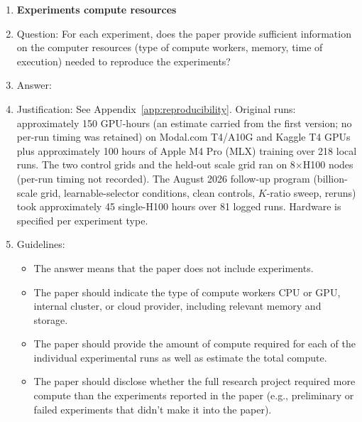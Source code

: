 \documentclass{article}
\begin{document}
\begin{enumerate}
\item {\bf Experiments compute resources}
    \item[] Question: For each experiment, does the paper provide sufficient information on the computer resources (type of compute workers, memory, time of execution) needed to reproduce the experiments?
    \item[] Answer: \answerYes{}
    \item[] Justification: See Appendix~\ref{app:reproducibility}. Original runs: approximately 150 GPU-hours (an estimate carried from the first version; no per-run timing was retained) on Modal.com T4/A10G and Kaggle T4 GPUs plus approximately 100 hours of Apple M4 Pro (MLX) training over 218 local runs. The two control grids and the held-out scale grid ran on 8${\times}$H100 nodes (per-run timing not recorded). The August 2026 follow-up program (billion-scale grid, learnable-selector conditions, clean controls, $K$-ratio sweep, reruns) took approximately 45 single-H100 hours over 81 logged runs. Hardware is specified per experiment type.
    \item[] Guidelines:
    \begin{itemize}
        \item The answer \answerNA{} means that the paper does not include experiments.
        \item The paper should indicate the type of compute workers CPU or GPU, internal cluster, or cloud provider, including relevant memory and storage.
        \item The paper should provide the amount of compute required for each of the individual experimental runs as well as estimate the total compute.
        \item The paper should disclose whether the full research project required more compute than the experiments reported in the paper (e.g., preliminary or failed experiments that didn't make it into the paper).
    \end{itemize}


\end{enumerate}
\end{document}
